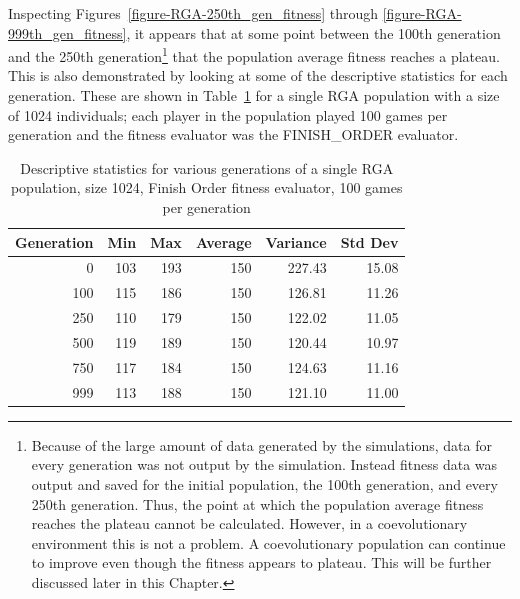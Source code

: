 Inspecting Figures~\ref{figure-RGA-250th_gen_fitness} through
\ref{figure-RGA-999th_gen_fitness}, it appears that at some point between the
100th generation and the 250th generation\footnote{Because of the large amount
of data generated by the simulations, data for every generation was not output
by the simulation. Instead fitness data was output and saved for the initial
population, the 100th generation, and every 250th generation. Thus, the point at
which the population average fitness reaches the plateau cannot be calculated.
However, in a coevolutionary environment this is not a problem. A coevolutionary
population can continue to improve even though the fitness appears to plateau.
This will be further discussed later in this Chapter.} that the population
average fitness reaches a plateau. This is also demonstrated by looking at some
of the descriptive statistics for each generation. These are shown in
Table~\ref{table-stats-for-s1024-n100-fo} for a single RGA population with a
size of 1024 individuals; each player in the population played 100 games per
generation and the fitness evaluator was the FINISH\_ORDER evaluator.

\begin{table}[ht]
\begin{center}
\begin{tabular}{ | r || r | r | r | r | r |}
\hline                        
Generation & Min & Max & Average & Variance & Std Dev \\ \hline \hline
0   & 103 & 193 & 150 & 227.43 & 15.08 \\ \hline
100 & 115 & 186 & 150 & 126.81 & 11.26 \\ \hline 
250 & 110 & 179 & 150 & 122.02 & 11.05 \\ \hline
500 & 119 & 189 & 150 & 120.44 & 10.97 \\ \hline
750 & 117 & 184 & 150 & 124.63 & 11.16 \\ \hline
999 & 113 & 188 & 150 & 121.10 & 11.00 \\ \hline
\end{tabular}
\caption{Descriptive statistics for various generations of a single RGA
population, size 1024, Finish Order fitness evaluator, 100 games per generation}
\label{table-stats-for-s1024-n100-fo}
\end{center}
\end{table}

